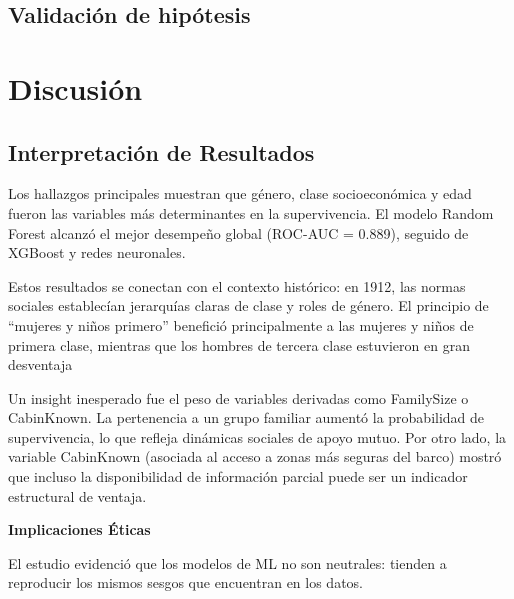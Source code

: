 \documentclass[sjournal]{IEEEtran}
\begin{document}
\subsection*{Validación de hipótesis}

\section{Discusión}

\subsection*{ Interpretación de Resultados}
Los hallazgos principales muestran que género, clase socioeconómica y edad fueron las variables más determinantes en la supervivencia. El modelo Random Forest alcanzó el mejor desempeño global (ROC-AUC = 0.889), seguido de XGBoost y redes neuronales.

Estos resultados se conectan con el contexto histórico: en 1912, las normas sociales establecían jerarquías claras de clase y roles de género. El principio de “mujeres y niños primero” benefició principalmente a las mujeres y niños de primera clase, mientras que los hombres de tercera clase estuvieron en gran desventaja

Un insight inesperado fue el peso de variables derivadas como FamilySize o CabinKnown. La pertenencia a un grupo familiar aumentó la probabilidad de supervivencia, lo que refleja dinámicas sociales de apoyo mutuo. Por otro lado, la variable CabinKnown (asociada al acceso a zonas más seguras del barco) mostró que incluso la disponibilidad de información parcial puede ser un indicador estructural de ventaja.

\textbf{\textbf{Implicaciones Éticas}}

\item 
El estudio evidenció que los modelos de ML no son neutrales: tienden a reproducir los mismos sesgos que encuentran en los datos.
\end{document}
